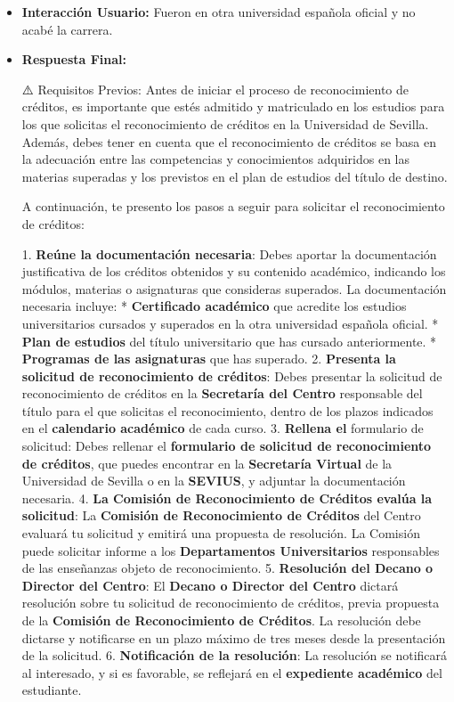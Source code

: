 \documentclass{article}
\begin{document}
\begin{itemize}
\begin{itemize}
                Recuerda que, en caso de desestimación, puedes interponer \textbf{recurso de alzada} ante el \textbf{Rector} de la Universidad de Sevilla.
          \item \textbf{Interacción Usuario:} Fueron en otra universidad española oficial y no acabé la carrera.
          \item \textbf{Respuesta Final:}

                ⚠️ Requisitos Previos:
                Antes de iniciar el proceso de reconocimiento de créditos, es importante que estés admitido y matriculado en los estudios para los que solicitas el reconocimiento de créditos en la Universidad de Sevilla. Además, debes tener en cuenta que el reconocimiento de créditos se basa en la adecuación entre las competencias y conocimientos adquiridos en las materias superadas y los previstos en el plan de estudios del título de destino.

                A continuación, te presento los pasos a seguir para solicitar el reconocimiento de créditos:

                1. \textbf{Reúne la documentación necesaria}: Debes aportar la documentación justificativa de los créditos obtenidos y su contenido académico, indicando los módulos, materias o asignaturas que consideras superados. La documentación necesaria incluye:
                * \textbf{Certificado académico} que acredite los estudios universitarios cursados y superados en la otra universidad española oficial.
                * \textbf{Plan de estudios} del título universitario que has cursado anteriormente.
                * \textbf{Programas de las asignaturas} que has superado.
                2. \textbf{Presenta la solicitud de reconocimiento de créditos}: Debes presentar la solicitud de reconocimiento de créditos en la \textbf{Secretaría del Centro} responsable del título para el que solicitas el reconocimiento, dentro de los plazos indicados en el \textbf{calendario académico} de cada curso.
                3. \textbf{Rellena el }formulario de solicitud\textbf{}: Debes rellenar el \textbf{formulario de solicitud de reconocimiento de créditos}, que puedes encontrar en la \textbf{Secretaría Virtual} de la Universidad de Sevilla o en la \textbf{SEVIUS}, y adjuntar la documentación necesaria.
                4. \textbf{La Comisión de Reconocimiento de Créditos evalúa la solicitud}: La \textbf{Comisión de Reconocimiento de Créditos} del Centro evaluará tu solicitud y emitirá una propuesta de resolución. La Comisión puede solicitar informe a los \textbf{Departamentos Universitarios} responsables de las enseñanzas objeto de reconocimiento.
                5. \textbf{Resolución del Decano o Director del Centro}: El \textbf{Decano o Director del Centro} dictará resolución sobre tu solicitud de reconocimiento de créditos, previa propuesta de la \textbf{Comisión de Reconocimiento de Créditos}. La resolución debe dictarse y notificarse en un plazo máximo de tres meses desde la presentación de la solicitud.
                6. \textbf{Notificación de la resolución}: La resolución se notificará al interesado, y si es favorable, se reflejará en el \textbf{expediente académico} del estudiante.


\end{itemize}
\end{itemize}
\end{document}
